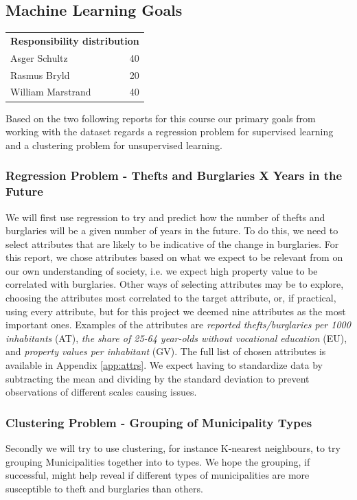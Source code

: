 \documentclass[11pt,fleqn]{article}
\newcommand{\respdist}[3]{
	\vspace*{-.5cm}
	\begin{table}[H]
	\small
		\begin{tabular}{l r}
			\multicolumn{2}{l}{\textbf{Responsibility distribution}}	\\
			Asger Schultz&	#1\pro\\
			Rasmus Bryld&	#2\pro\\
			William Marstrand&#3\pro
		\end{tabular}
	\end{table}
	\vspace*{-.3cm}
}
\numberwithin{footnote}{section}
\numberwithin{figure}{section}
\numberwithin{table}{section}
\begin{document}
\subsection{Machine Learning Goals}
\respdist{40}{20}{40}
Based on the two following reports for this course our primary goals from working with the dataset regards a regression problem for supervised learning and a clustering problem for unsupervised learning.

\subsubsection{Regression Problem - Thefts and Burglaries X Years in the Future}
We will first use regression to try and predict how the number of thefts and burglaries will be a given number of years in the future.
To do this, we need to select attributes that are likely to be indicative of the change in burglaries.
For this report, we chose attributes based on what we expect to be relevant from on our own understanding of society, i.e. we expect high property value to be correlated with burglaries. 
Other ways of selecting attributes may be to explore, choosing the attributes most correlated to the target attribute, or, if practical, using every attribute, but for this project we deemed nine attributes as the most important ones.
Examples of the attributes are \textit{reported thefts/burglaries per 1000 inhabitants} (AT), \textit{the share of 25-64 year-olds without vocational education} (EU), and \textit{property values per inhabitant} (GV).
The full list of chosen attributes is available in Appendix \ref{app:attrs}.
We expect having to standardize data by subtracting the mean and dividing by the standard deviation to prevent observations of different scales causing issues.

\subsubsection{Clustering Problem - Grouping of Municipality Types}
Secondly we will try to use clustering, for instance K-nearest neighbours, to try grouping Municipalities together into to types.
We hope the grouping, if successful, might help reveal if different types of municipalities are more susceptible to theft and burglaries than others.
\end{document}
